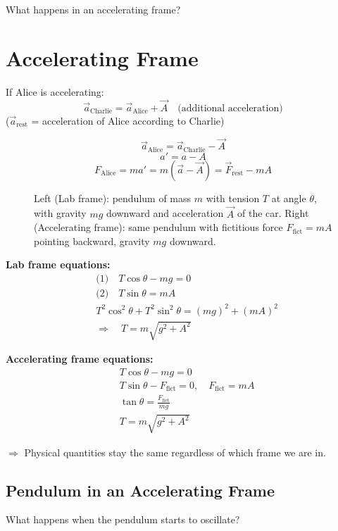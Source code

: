 What happens in an accelerating frame?

\section{Accelerating Frame}

If Alice is accelerating:
\[
  \vec{a}_\text{Charlie} = \vec{a}_\text{Alice} + \vec{A} \quad \text{(additional acceleration)}
\]
($\vec{a}_\text{rest}$ = acceleration of Alice according to Charlie)

\[
  \vec{a}_\text{Alice} = \vec{a}_\text{Charlie} - \vec{A}
\]
\[
  a' = a - A
\]
\[
  F_\text{Alice} = ma' = m(\vec{a} - \vec{A}) = \vec{F}_\text{rest} - mA
\]

\begin{figure}[H]
  \centering
  \caption{Left (Lab frame): pendulum of mass $m$ with tension $T$ at angle $\theta$, with gravity $mg$ downward and acceleration $\vec{A}$ of the car. Right (Accelerating frame): same pendulum with fictitious force $F_\text{fict} = mA$ pointing backward, gravity $mg$ downward.}
\end{figure}

\textbf{Lab frame equations:}
\begin{align*}
  &\text{(1)}\quad T\cos\theta - mg = 0 \\
  &\text{(2)}\quad T\sin\theta = mA \\
  &T^2\cos^2\theta + T^2\sin^2\theta = (mg)^2 + (mA)^2 \\
  &\Rightarrow \quad T = m\sqrt{g^2 + A^2}
\end{align*}

\textbf{Accelerating frame equations:}
\begin{align*}
  &T\cos\theta - mg = 0 \\
  &T\sin\theta - F_\text{fict} = 0, \quad F_\text{fict} = mA \\
  &\tan\theta = \frac{F_\text{fict}}{mg} \\
  &T = m\sqrt{g^2+A^2}
\end{align*}

$\Rightarrow$ Physical quantities stay the same regardless of which frame we are in.

\subsection{Pendulum in an Accelerating Frame}

What happens when the pendulum starts to oscillate?

